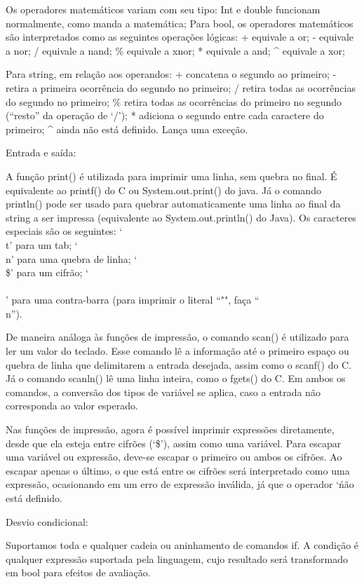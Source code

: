 \documentclass[12pt,a4paper]{article}
\begin{document}
Os operadores matemáticos variam com seu tipo:
Int e double funcionam normalmente, como manda a matemática;
Para bool, os operadores matemáticos são interpretados como as seguintes operações lógicas:
+ equivale a or;
- equivale a nor;
/ equivale a nand;
\% equivale a xnor;
* equivale a and;
^ equivale a xor;

Para string, em relação aos operandos:
+ concatena o segundo ao primeiro;
- retira a primeira ocorrência do segundo no primeiro;
/ retira todas as ocorrências do segundo no primeiro;
\% retira todas as ocorrências do primeiro no segundo (``resto'' da operação de `/');
* adiciona o segundo entre cada caractere do primeiro;
^ ainda não está definido. Lança uma exceção.


Entrada e saída:

A função print() é utilizada para imprimir uma linha, sem quebra no final. É equivalente ao printf() do C ou System.out.print() do java. Já o comando println() pode ser usado para quebrar automaticamente uma linha ao final da string a ser impressa (equivalente ao System.out.println() do Java). Os caracteres especiais são os seguintes:
`\\t' para um tab;
`\\n' para uma quebra de linha;
`\\\$' para um cifrão;
`\\\\' para uma contra-barra (para imprimir o literal ``\n"", faça ``\\n'').


De maneira análoga às funções de impressão, o comando scan() é utilizado para ler um valor do teclado. Esse comando lê a informação até o primeiro espaço ou quebra de linha que delimitarem a entrada desejada, assim como o scanf() do C. Já o comando scanln() lê uma linha inteira, como o fgets() do C. Em ambos os comandos, a conversão dos tipos de variável se aplica, caso a entrada não corresponda ao valor esperado.

Nas funções de impressão, agora é possível imprimir expressões diretamente, desde que ela esteja entre cifrões (`\$'), assim como uma variável. Para escapar uma variável ou expressão, deve-se escapar o primeiro ou ambos os cifrões. Ao escapar apenas o último, o que está entre os cifrões será interpretado como uma expressão, ocasionando em um erro de expressão inválida, já que o operador `\' não está definido.


Desvio condicional:

Suportamos toda e qualquer cadeia ou aninhamento de comandos if. A condição é qualquer expressão suportada pela linguagem, cujo resultado será transformado em bool para efeitos de avaliação.
\end{document}
